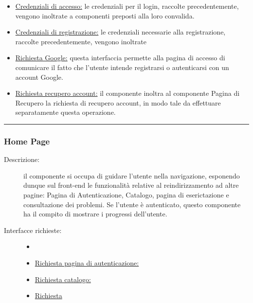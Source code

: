 \documentclass[11pt, a4paper]{article}
\theoremstyle{definition} %
\begin{document}
\begin{description}
\begin{itemize}
        \item \underline{Credenziali di accesso:} le credenziali per il login,
        raccolte precedentemente, vengono inoltrate a componenti preposti alla
        loro convalida.

        \item \underline{Credenziali di registrazione:} le credenziali necessarie
        alla registrazione, raccolte precedentemente, vengono inoltrate 

        \item \underline{Richiesta Google:} questa interfaccia permette alla
        pagina di accesso di comunicare il fatto che l'utente intende registrarsi
        o autenticarsi con un account Google.

        \item \underline{Richiesta recupero account:} il componente inoltra
        al componente Pagina di Recupero la richiesta di recupero account, in modo
        tale da effettuare separatamente questa operazione.
    \end{itemize}
\end{description}
\fi


\begin{center}
    \rule{5cm}{1pt}
\end{center}


\subsubsection{Home Page}
\begin{description}
    \item[Descrizione:] il componente si occupa di guidare l'utente nella
    navigazione, esponendo dunque sul front-end le funzionalità relative
    al reindirizzamento ad altre pagine: Pagina di Autenticazione, Catalogo, pagina
    di eserictazione e consultazione dei problemi. Se l'utente è autenticato,
    questo componente ha il compito di mostrare i progressi dell'utente.
    \item[Interfacce richieste:]
    \begin{itemize}
        \item[]
        \item \underline{Richiesta pagina di autenticazione:}
        \item \underline{Richiesta catalogo:}
        \item \underline{Richiesta}
    \end{itemize}
\end{description}
\end{document}
